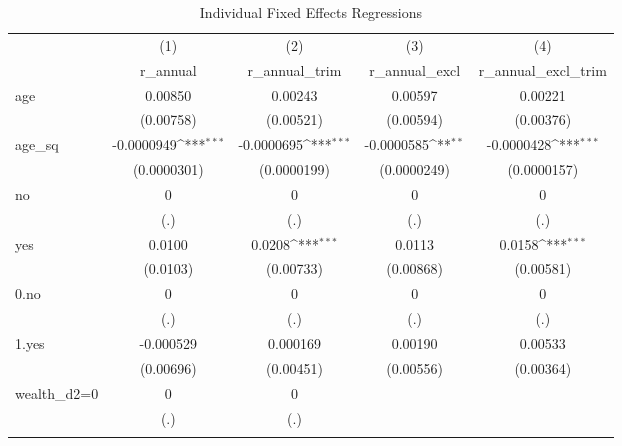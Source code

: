 \begin{table}[htbp]\centering
\def\sym#1{\ifmmode^{#1}\else\(^{#1}\)\fi}
\caption{Individual Fixed Effects Regressions}
\begin{tabular}{l*{4}{c}}
\toprule
                &\multicolumn{1}{c}{(1)}&\multicolumn{1}{c}{(2)}&\multicolumn{1}{c}{(3)}&\multicolumn{1}{c}{(4)}\\
                &\multicolumn{1}{c}{r\_annual}&\multicolumn{1}{c}{r\_annual\_trim}&\multicolumn{1}{c}{r\_annual\_excl}&\multicolumn{1}{c}{r\_annual\_excl\_trim}\\
\midrule
age             &  0.00850         &  0.00243         &  0.00597         &  0.00221         \\
                &(0.00758)         &(0.00521)         &(0.00594)         &(0.00376)         \\
\addlinespace
age\_sq          &-0.0000949\sym{***}&-0.0000695\sym{***}&-0.0000585\sym{**} &-0.0000428\sym{***}\\
                &(0.0000301)         &(0.0000199)         &(0.0000249)         &(0.0000157)         \\
\addlinespace
no              &        0         &        0         &        0         &        0         \\
                &      (.)         &      (.)         &      (.)         &      (.)         \\
\addlinespace
yes             &   0.0100         &   0.0208\sym{***}&   0.0113         &   0.0158\sym{***}\\
                & (0.0103)         &(0.00733)         &(0.00868)         &(0.00581)         \\
\addlinespace
0.no            &        0         &        0         &        0         &        0         \\
                &      (.)         &      (.)         &      (.)         &      (.)         \\
\addlinespace
1.yes           &-0.000529         & 0.000169         &  0.00190         &  0.00533         \\
                &(0.00696)         &(0.00451)         &(0.00556)         &(0.00364)         \\
\addlinespace
wealth\_d2=0     &        0         &        0         &                  &                  \\
                &      (.)         &      (.)         &                  &                  \\
\addlinespace

\end{tabular}
\end{table}
